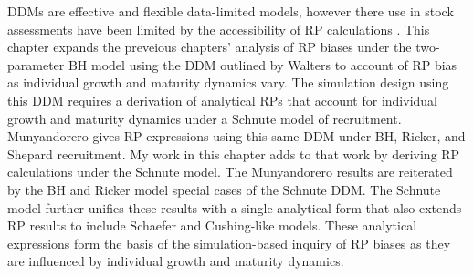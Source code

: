 DDMs are effective and flexible data-limited models, however there use in 
stock assessments have been limited by the accessibility of RP calculations 
\cite{munyandorero_analytical_2023}. %
%
This chapter expands the preveious chapters' analysis of RP biases under the 
two-parameter BH model using the DDM outlined by Walters \cite{walters_continuous_2020}
to account of RP bias as individual growth and maturity dynamics vary.
%
The simulation design using this DDM requires a derivation 
of analytical RPs that account for individual growth and
maturity dynamics under a Schnute model of recruitment.
Munyandorero \cite{munyandorero_analytical_2023} gives RP expressions using 
this same DDM %
under BH, Ricker, and Shepard recruitment. 
My work in this chapter adds to that work by deriving RP calculations under 
the Schnute model. The Munyandorero results are reiterated by the BH and Ricker 
model special cases of the Schnute DDM. %
The Schnute model further unifies these results with a single analytical form that 
also extends RP results to include Schaefer and Cushing-like models. 
These analytical expressions form the basis of the simulation-based inquiry of 
RP biases as they are influenced by individual growth and maturity dynamics.

